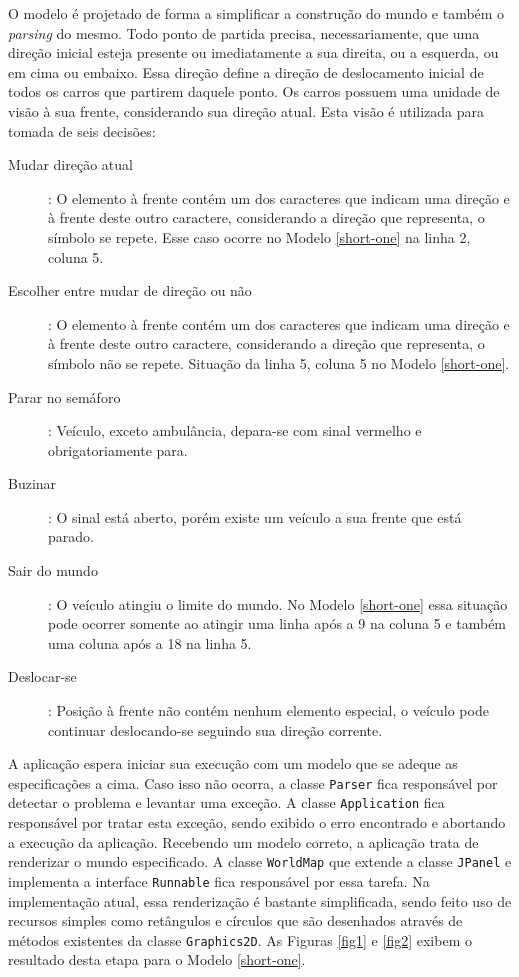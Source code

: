O modelo é projetado de forma a simplificar a construção do mundo e
também o \textit{parsing} do mesmo. Todo ponto de partida precisa,
necessariamente, que uma direção inicial esteja presente ou
imediatamente a sua direita, ou a esquerda, ou em cima ou
embaixo. Essa direção define a direção de deslocamento inicial de
todos os carros que partirem daquele ponto. Os carros possuem uma
unidade de visão à sua frente, considerando sua direção atual. Esta
visão é utilizada para tomada de seis decisões:
\begin{description}
\item[Mudar direção atual]: O elemento à frente contém um dos
  caracteres que indicam uma direção e à frente deste outro caractere,
  considerando a direção que representa, o símbolo se repete. Esse
  caso ocorre no Modelo \ref{short-one} na linha 2, coluna 5.
\item[Escolher entre mudar de direção ou não]: O elemento à frente
  contém um dos caracteres que indicam uma direção e à frente deste
  outro caractere, considerando a direção que representa, o símbolo
  não se repete. Situação da linha 5, coluna 5 no Modelo \ref{short-one}.
\item[Parar no semáforo]: Veículo, exceto ambulância, depara-se com
  sinal vermelho e obrigatoriamente para.
\item[Buzinar]: O sinal está aberto, porém existe um veículo a sua
  frente que está parado.
\item[Sair do mundo]: O veículo atingiu o limite do mundo. No Modelo
  \ref{short-one} essa situação pode ocorrer somente ao atingir uma
  linha após a 9 na coluna 5 e também uma coluna após a 18 na linha 5.
\item[Deslocar-se]: Posição à frente não contém nenhum elemento
  especial, o veículo pode continuar deslocando-se seguindo sua
  direção corrente.
\end{description}

A aplicação espera iniciar sua execução com um modelo que se adeque as
especificações a cima. Caso isso não ocorra, a classe \verb!Parser!
fica responsável por detectar o problema e levantar uma exceção. A
classe \verb!Application! fica responsável por tratar esta exceção,
sendo exibido o erro encontrado e abortando a execução da aplicação.
Recebendo um modelo correto, a aplicação trata de renderizar o mundo
especificado. A classe \verb!WorldMap! que extende a classe
\verb!JPanel! e implementa a interface \verb!Runnable! fica
responsável por essa tarefa. Na implementação atual, essa renderização
é bastante simplificada, sendo feito uso de recursos simples como
retângulos e círculos que são desenhados através de métodos existentes
da classe \verb!Graphics2D!. As Figuras \ref{fig1} e \ref{fig2} exibem
o resultado desta etapa para o Modelo \ref{short-one}.

